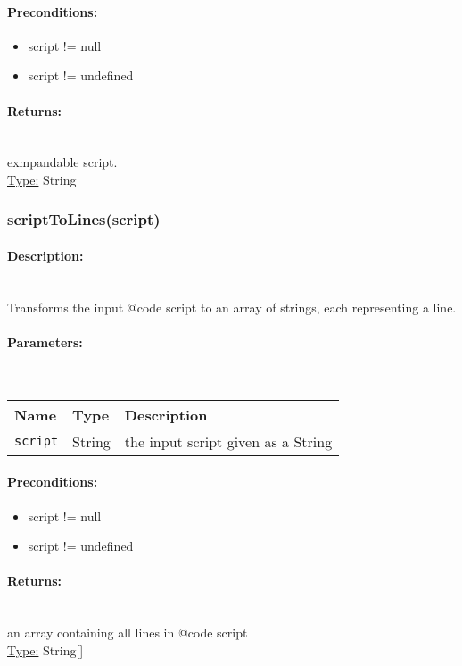 \paragraph{Preconditions:} 
\begin{itemize}  
\item  script != null
\item  script != undefined
\end{itemize}  
\paragraph{Returns:} \hfill \\ 
exmpandable script.\\ 
\underline{Type:} String
\subsubsection{scriptToLines(script)} 
\paragraph{Description:} \hfill \\ 
Transforms the input {@code script} to an array of strings,
each representing a line.
\paragraph{Parameters:} \hfill \\ 
\begin{tabular}{|l|l|l|}
\hline
\textbf{Name} & \textbf{Type} & \textbf{Description} \\ 
\hline
\texttt{script} & String & the input script given as a String\\ 
\hline
\end{tabular}
\paragraph{Preconditions:} 
\begin{itemize}  
\item  script != null
\item  script != undefined
\end{itemize}  
\paragraph{Returns:} \hfill \\ 
an array containing all lines in {@code script}\\ 
\underline{Type:} String[]

